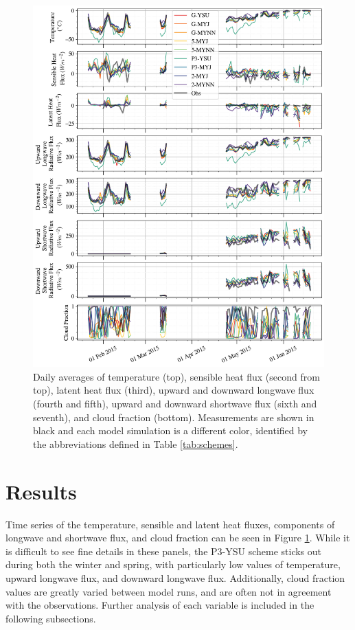 \begin{figure}[p!]
    \centering
        \vspace*{-1cm}
    \includegraphics[width=1\linewidth]{figures/chapter3/WRF_totaltimeseries.png}
    \caption[Polar WRF simulated temperature, pressure, sensible and latent heat flux, components of longwave and shortwave flux, and cloud fraction time series.]{Daily averages of temperature (top), sensible heat flux (second from top), latent heat flux (third), upward and downward longwave flux (fourth and fifth), upward and downward shortwave flux (sixth and seventh), and cloud fraction (bottom). Measurements are shown in black and each model simulation is a different color, identified by the abbreviations defined in Table \ref{tab:schemes}.}
    \label{fig:wrf_all}
\end{figure}

\section{Results}
Time series of the temperature, sensible and latent heat fluxes, components of longwave and shortwave flux, and cloud fraction can be seen in Figure \ref{fig:wrf_all}. While it is difficult to see fine details in these panels, the P3-YSU scheme sticks out during both the winter and spring, with particularly low values of temperature, upward longwave flux, and downward longwave flux. Additionally, cloud fraction values are greatly varied between model runs, and are often not in agreement with the observations. Further analysis of each variable is included in the following subsections.

